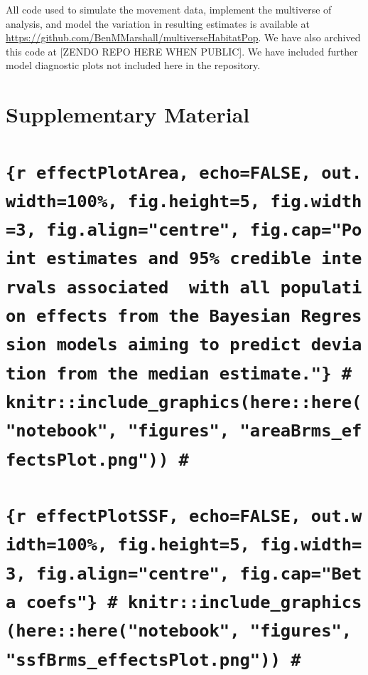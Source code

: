 \documentclass[10pt,a4paper]{article}
\begin{document}
All code used to simulate the movement data, implement the multiverse of analysis, and model the variation in resulting estimates is available at \url{https://github.com/BenMMarshall/multiverseHabitatPop}.
We have also archived this code at {[}ZENDO REPO HERE WHEN PUBLIC{]}.
We have included further model diagnostic plots not included here in the repository.

\clearpage

\section{Supplementary Material}\label{supplementary-material}

\section{\texorpdfstring{\texttt{\{r\ effectPlotArea,\ echo=FALSE,\ out.width=\textquotesingle{}100\%\textquotesingle{},\ fig.height=5,\ fig.width=3,\ fig.align="centre",\ fig.cap="Point\ estimates\ and\ 95\%\ credible\ intervals\ associated\ \ with\ all\ population\ effects\ from\ the\ Bayesian\ Regression\ models\ aiming\ to\ predict\ deviation\ from\ the\ median\ estimate."\}\ \#\ knitr::include\_graphics(here::here("notebook",\ "figures",\ "areaBrms\_effectsPlot.png"))\ \#}}{\{r effectPlotArea, echo=FALSE, out.width=\%\textquotesingle, fig.height=5, fig.width=3, fig.align="centre", fig.cap="Point estimates and 95\% credible intervals associated  with all population effects from the Bayesian Regression models aiming to predict deviation from the median estimate."\} \# knitr::include\_graphics(here::here("notebook", "figures", "areaBrms\_effectsPlot.png")) \#}}\label{r-effectplotarea-echofalse-out.width100-fig.height5-fig.width3-fig.aligncentre-fig.cappoint-estimates-and-95-credible-intervals-associated-with-all-population-effects-from-the-bayesian-regression-models-aiming-to-predict-deviation-from-the-median-estimate.-knitrinclude_graphicshereherenotebook-figures-areabrms_effectsplot.png}

\section{}\label{section}

\section{\texorpdfstring{\texttt{\{r\ effectPlotSSF,\ echo=FALSE,\ out.width=\textquotesingle{}100\%\textquotesingle{},\ fig.height=5,\ fig.width=3,\ fig.align="centre",\ fig.cap="Beta\ coefs"\}\ \#\ knitr::include\_graphics(here::here("notebook",\ "figures",\ "ssfBrms\_effectsPlot.png"))\ \#}}{\{r effectPlotSSF, echo=FALSE, out.width=\%\textquotesingle, fig.height=5, fig.width=3, fig.align="centre", fig.cap="Beta coefs"\} \# knitr::include\_graphics(here::here("notebook", "figures", "ssfBrms\_effectsPlot.png")) \#}}\label{r-effectplotssf-echofalse-out.width100-fig.height5-fig.width3-fig.aligncentre-fig.capbeta-coefs-knitrinclude_graphicshereherenotebook-figures-ssfbrms_effectsplot.png}
\end{document}
